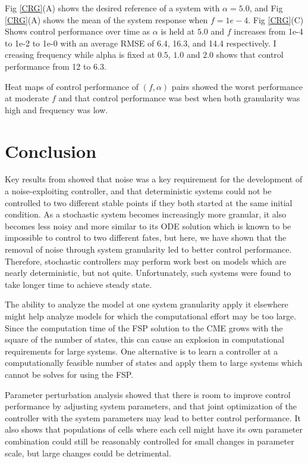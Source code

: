 \documentclass[12pt]{article}
\begin{document}
Fig \ref{CRG}(A) shows the desired reference of a system with $\alpha = 5.0$, and Fig \ref{CRG}(A) shows the mean of the system response when $f=1e-4$. Fig \ref{CRG}(C) Shows control performance over time as $\alpha$ is held at $5.0$ and $f$ increases from 1e-4 to 1e-2 to 1e-0 with an average RMSE of 6.4, 16.3, and 14.4 respectively. I creasing frequency while alpha is fixed at $0.5$, $1.0$ and $2.0$ shows that control performance from 12 to 6.3.

Heat maps of control performance of $(f,\alpha)$ pairs showed the worst performance at moderate $f$ and that control performance was best when both granularity was high and frequency was low.


\section{Conclusion}




Key results from \cite{May2021} showed that noise was a key requirement for the development of a noise-exploiting controller, and that deterministic systems could not be controlled to two different stable points if they both started at the same initial condition. As a stochastic system becomes increasingly more granular, it also becomes less noisy and more similar to its ODE solution which is known to be impossible to control to two different fates, but here, we have shown that the removal of noise through system granularity led to better control performance.  Therefore, stochastic controllers may perform work best on models which are nearly deterministic, but not quite. Unfortunately, such systems were found to take longer time to achieve steady state.

The ability to analyze the model at one system granularity apply it elsewhere might help analyze models for which the computational effort may be too large. Since the computation time of the FSP solution to the CME grows with the square of the number of states, this can cause an explosion in computational requirements for large systems. One alternative is to learn a controller at a computationally feasible number of states and apply them to large systems which cannot be solves for using the FSP. 

Parameter perturbation analysis showed that there is room to improve control performance by adjusting system parameters, and that joint optimization of the controller with the system parameters may lead to better control performance. It also shows that populations of cells where each cell might have its own parameter combination could still be reasonably controlled for small changes in parameter scale, but large changes could be detrimental.
\end{document}
